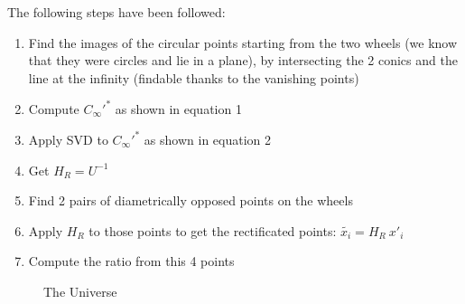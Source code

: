 \documentclass{article}
\begin{document}
\vspace{6mm}
The following steps have been followed:
\begin{enumerate}
    \item Find the images of the circular points starting from the two wheels (we know that they were circles and lie in a plane), by intersecting the 2 conics and the line at the infinity (findable thanks to the vanishing points)
    \item Compute $ C_\infty'^* $ as shown in equation 1
    \item Apply SVD to $ C_\infty'^* $ as shown in equation 2
    \item Get $ H_R = U^{-1} $
    \item Find 2 pairs of diametrically opposed points on the wheels
    \item Apply $ H_R $ to those points to get the rectificated points:
          $ \tilde{x_i} = H_R \: x'_i $
    \item Compute the ratio from this 4 points
\end{enumerate}

\begin{figure}[h!]
\centering
\caption{The Universe}
\label{fig:universe}
\end{figure}

\newpage
\end{document}
